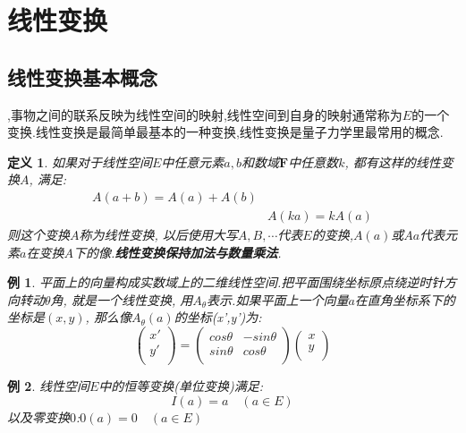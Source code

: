 \documentclass[a4paper,11pt]{book}
\newtheorem{definition}{\hspace{2em}定义}[section]
\newtheorem{example}{例}[section]
\begin{document}
\section{线性变换}
\subsection*{线性变换基本概念}
,事物之间的联系反映为线性空间的映射,线性空间到自身的映射通常称为$E$的一个变换.线性变换是最简单最基本的一种变换,线性变换是量子力学里最常用的概念.
\begin{definition}
  如果对于线性空间$E$中任意元素$a,b$和数域$\mathbf{F}$中任意数$k$, 都有这样的线性变换$A$, 满足:
  \begin{equation*}
  \begin{split}
     A(a+b)=A(a)+A(b)\\
     &A(ka)=kA(a)
  \end{split}
  \end{equation*}
  则这个变换$A$称为线性变换, 以后使用大写$A,B,\cdots$代表$E$的变换,$A(a)$或$Aa$代表元素$a$在变换$A$下的像.\textbf{线性变换保持加法与数量乘法}.
\end{definition}
\begin{example}
  平面上的向量构成实数域上的二维线性空间.把平面围绕坐标原点绕逆时针方向转动$\theta$角, 就是一个线性变换, 用$A_\theta$表示.如果平面上一个向量$a$在直角坐标系下的坐标是$(x,y)$, 那么像$A_\theta(a)$的坐标(x',y')为:
  \begin{equation*}
    \begin{pmatrix}
      x' \\
      y' \\
    \end{pmatrix}=\begin{pmatrix}
                    cos\theta & -sin\theta \\
                    sin\theta & cos\theta \\
                  \end{pmatrix}\begin{pmatrix}
                                 x \\
                                 y \\
                               \end{pmatrix}
  \end{equation*}
\end{example}
\begin{example}
  线性空间$E$中的恒等变换(单位变换)满足:
  \begin{equation*}
    I(a)=a\quad(a\in E)
  \end{equation*}
  以及零变换$0$:$0(a)=0\quad (a\in E)$
\end{example}
\end{document}
